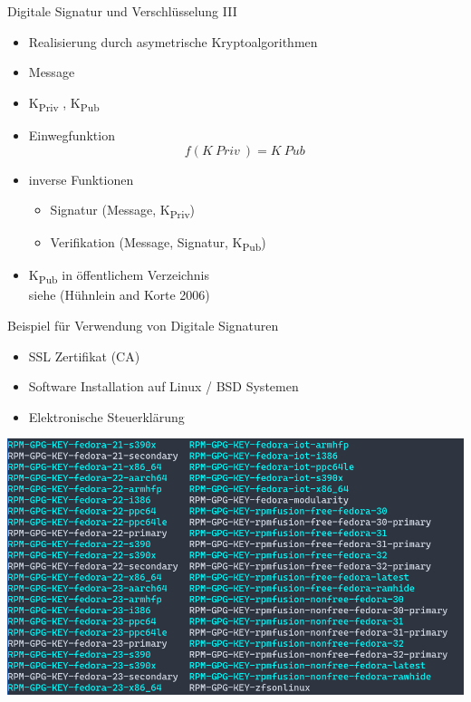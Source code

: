 \documentclass[
  10pt,
  ignorenonframetext,
  aspectratio=43,
]{beamer}
\providecommand{\tightlist}{%
  \setlength{\itemsep}{0pt}\setlength{\parskip}{0pt}}
\begin{document}
\begin{frame}{Digitale Signatur und Verschlüsselung III}
\protect\hypertarget{digitale-signatur-und-verschluxfcsselung-iii}{}
\begin{itemize}
\item
  Realisierung durch asymetrische Kryptoalgorithmen
\item
  Message
\item
  K\textsubscript{Priv} , K\textsubscript{Pub}
\item
  Einwegfunktion \[f(K~Priv~) = K~Pub~\]
\item
  inverse Funktionen

  \begin{itemize}
  \tightlist
  \item
    Signatur (Message, K\textsubscript{Priv})
  \item
    Verifikation (Message, Signatur, K\textsubscript{Pub})
  \end{itemize}
\item
  K\textsubscript{Pub} in öffentlichem Verzeichnis\\
  siehe (Hühnlein and Korte 2006)
\end{itemize}
\end{frame}

\begin{frame}{Beispiel für Verwendung von Digitale Signaturen}
\protect\hypertarget{beispiel-fuxfcr-verwendung-von-digitale-signaturen}{}
\begin{itemize}
\tightlist
\item
  SSL Zertifikat (CA)
\item
  Software Installation auf Linux / BSD Systemen
\item
  Elektronische Steuerklärung
\end{itemize}

\includegraphics[width=\textwidth,height=0.6\textheight]{Abbildungen/GPG.png}
\end{frame}
\end{document}
